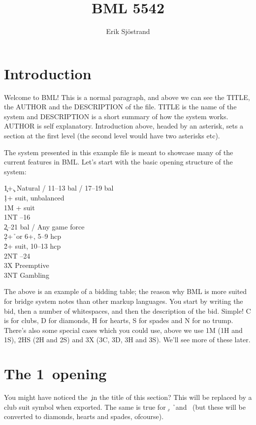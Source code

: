 \documentclass[a4paper]{article}
\title{BML 5542}
\author{Erik Sjöstrand}
\begin{document}
\maketitle
\tableofcontents

\section{Introduction}

Welcome to BML! This is a normal paragraph, and above we can see
the TITLE, the AUTHOR and the DESCRIPTION of the file. TITLE is
the name of the system and DESCRIPTION is a short summary of how
the system works. AUTHOR is self explanatory. Introduction above,
headed by an asterisk, sets a section at the first level (the second
level would have two asterisks etc).

The system presented in this example file is meant to showcase many
of the current features in BML. Let's start with the basic opening
structure of the system:

\begin{bidtable}
1\c {}+\c. Natural / 11--13 bal / 17--19 bal\\
1\d {}+ suit, unbalanced\\
1M + suit\\
1NT --16\\
2\c {}--21 bal / Any game force\\
2\d {}+\h\ or 6+\s, 5--9 hcp\\
2\h\s {}+ suit, 10--13 hcp\\
2NT --24\\
3X \> Preemptive\\
3NT \> Gambling
\end{bidtable}

The above is an example of a bidding table; the reason why BML is
more suited for bridge system notes than other markup languages. You
start by writing the bid, then a number of whitespaces, and then the
description of the bid. Simple! C is for clubs, D for diamonds, H
for hearts, S for spades and N for no trump. There's also some
special cases which you could use, above we use 1M (1H and 1S), 2HS
(2H and 2S) and 3X (3C, 3D, 3H and 3S). We'll see more of these
later.

\section{The 1\pdfc\ opening}

You might have noticed the \c\ in the title of this section? This
will be replaced by a club suit symbol when exported. The same is
true for \d, \h\ and \s\ (but these will be converted to diamonds,
hearts and spades, ofcourse).
\end{document}
